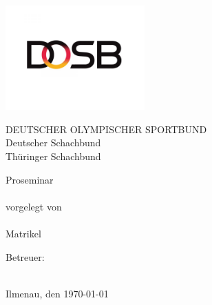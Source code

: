 \begin{titlepage}

\begin{center}
\includegraphics[height=4cm]{pics/DOSB.png}
\vspace{1cm}

DEUTSCHER OLYMPISCHER SPORTBUND\\
Deutscher Schachbund\\
Thüringer Schachbund

\vspace{4cm}

{\large Proseminar} \\ 
\vspace{1cm}
{\LARGE \normalfont \bfseries \sathema} \\
\vspace{1cm}
{vorgelegt von} \\
\vspace{0.5cm}
{\large \saauthor}\\
{\large Matrikel \matrikel}
\vspace{2cm}

Betreuer: \\
\vspace{0.5cm}
\saprof \\

\vspace{1cm}

Ilmenau, den \today
\end{center}

\end{titlepage}
